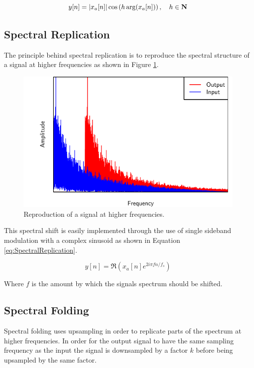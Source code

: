 		\begin{equation}
			y[n] = \left|x_{a}[n]\right| \cos \left( h\arg(x_{a}[n]) \right), \quad h \in \textbf{N}
			\label{eq:IAP}
		\end{equation}

	\subsection{Spectral Replication}
	\label{sec:Excitation-Methods-SpectralReplication}
		The principle behind spectral replication is to reproduce the spectral structure of a signal at higher
		frequencies as shown in Figure \ref{fig:SpectralReplication}.

		\begin{figure}[h!]
			\centering
			\includegraphics{chapter3/Images/SpectralReplicationSpectrum.pdf}
			\caption{Reproduction of a signal at higher frequencies.}
			\label{fig:SpectralReplication}
		\end{figure}

		This spectral shift is easily implemented through the use of single sideband modulation with a complex
		sinusoid as shown in Equation \ref{eq:SpectralReplication}.

		\begin{equation}
			y[n] = \Re \left( x_{a}[n] e^{2i\pi fn/ f_{s}} \right)
			\label{eq:SpectralReplication}
		\end{equation}

		Where $f$ is the amount by which the signals spectrum should be shifted.

	\subsection{Spectral Folding}
	\label{sec:Excitation-Methods-SpectralFolding}
		Spectral folding uses upsampling in order to replicate parts of the spectrum at higher frequencies. In
		order for the output signal to have the same sampling frequency as the input the signal is 
		downsampled by a factor $k$ before being upsampled by the same factor. 
		

